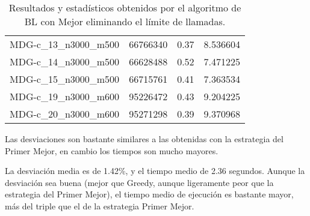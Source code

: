 \documentclass{article}
\begin{document}
\begin{table}[H]
\begin{tabular}{|lrrr|}
		MDG-c\_13\_n3000\_m500 & 66766340 & 0.37 & 8.536604\\
		MDG-c\_14\_n3000\_m500 & 66628488 & 0.52 & 7.471225\\
		MDG-c\_15\_n3000\_m500 & 66715761 & 0.41 & 7.363534\\
		MDG-c\_19\_n3000\_m600 & 95226472 & 0.43 & 9.204225\\
		MDG-c\_20\_n3000\_m600 & 95271298 & 0.39 & 9.370968\\
		\hline
	\end{tabular}
	\caption{Resultados y estadísticos obtenidos por el algoritmo de BL con Mejor eliminando el límite de llamadas.}
\label{tab:ls2-nolim}
\end{table}

Las desviaciones son bastante similares a las obtenidas con la estrategia del Primer Mejor, en cambio los tiempos son mucho mayores.

La desviación media es de 1.42\%, y el tiempo medio de 2.36 segundos. Aunque la desviación sea buena (mejor que Greedy, aunque
ligeramente peor que la estrategia del Primer Mejor), el tiempo medio de ejecución es bastante mayor, más del triple que el de la
estrategia Primer Mejor.
\end{document}
